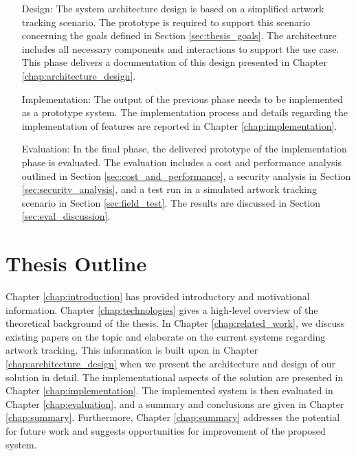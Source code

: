 \begin{itemize}[font=\itshape, align=left, itemindent=0.5cm]
    \item[Design:] The system architecture design is based on a simplified artwork tracking scenario. The prototype is required to support this scenario concerning the goals defined in Section \ref{sec:thesis_goals}. The architecture includes all necessary components and interactions to support the use case. This phase delivers a documentation of this design presented in Chapter \ref{chap:architecture_design}.
    \item[Implementation:] The output of the previous phase needs to be implemented as a prototype system. The implementation process and details regarding the implementation of features are reported in Chapter \ref{chap:implementation}. 
    \item[Evaluation:] In the final phase, the delivered prototype of the implementation phase is evaluated. The evaluation includes a cost and performance analysis outlined in Section \ref{sec:cost_and_performance}, a security analysis in Section \ref{sec:security_analysis}, and a test run in a simulated artwork tracking scenario in Section \ref{sec:field_test}. The results are discussed in Section \ref{sec:eval_discussion}.
\end{itemize}


\section{Thesis Outline}
Chapter \ref{chap:introduction} has provided introductory and motivational information. Chapter \ref{chap:technologies} gives a high-level overview of the theoretical background of the thesis. In Chapter \ref{chap:related_work}, we discuss existing papers on the topic and elaborate on the current systems regarding artwork tracking. This information is built upon in Chapter \ref{chap:architecture_design} when we present the architecture and design of our solution in detail. The implementational aspects of the solution are presented in Chapter \ref{chap:implementation}. The implemented system is then evaluated in Chapter \ref{chap:evaluation}, and a summary and conclusions are given in Chapter \ref{chap:summary}. Furthermore, Chapter \ref{chap:summary} addresses the potential for future work and suggests opportunities for improvement of the proposed system.

